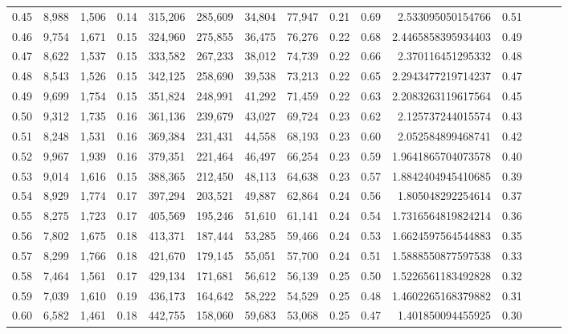 \begin{tabular}{rrrrrrrrrrrrrrr}
0.45 &   8,988 &  1,506 &  0.14 &  315,206 &  285,609 &   34,804 &   77,947 &  0.21 &  0.69 &     2.533095050154766 &      0.51 \\
0.46 &   9,754 &  1,671 &  0.15 &  324,960 &  275,855 &   36,475 &   76,276 &  0.22 &  0.68 &    2.4465858395934403 &      0.49 \\
0.47 &   8,622 &  1,537 &  0.15 &  333,582 &  267,233 &   38,012 &   74,739 &  0.22 &  0.66 &     2.370116451295332 &      0.48 \\
0.48 &   8,543 &  1,526 &  0.15 &  342,125 &  258,690 &   39,538 &   73,213 &  0.22 &  0.65 &    2.2943477219714237 &      0.47 \\
0.49 &   9,699 &  1,754 &  0.15 &  351,824 &  248,991 &   41,292 &   71,459 &  0.22 &  0.63 &    2.2083263119617564 &      0.45 \\
0.50 &   9,312 &  1,735 &  0.16 &  361,136 &  239,679 &   43,027 &   69,724 &  0.23 &  0.62 &     2.125737244015574 &      0.43 \\
0.51 &   8,248 &  1,531 &  0.16 &  369,384 &  231,431 &   44,558 &   68,193 &  0.23 &  0.60 &     2.052584899468741 &      0.42 \\
0.52 &   9,967 &  1,939 &  0.16 &  379,351 &  221,464 &   46,497 &   66,254 &  0.23 &  0.59 &    1.9641865704073578 &      0.40 \\
0.53 &   9,014 &  1,616 &  0.15 &  388,365 &  212,450 &   48,113 &   64,638 &  0.23 &  0.57 &    1.8842404945410685 &      0.39 \\
0.54 &   8,929 &  1,774 &  0.17 &  397,294 &  203,521 &   49,887 &   62,864 &  0.24 &  0.56 &     1.805048292254614 &      0.37 \\
0.55 &   8,275 &  1,723 &  0.17 &  405,569 &  195,246 &   51,610 &   61,141 &  0.24 &  0.54 &    1.7316564819824214 &      0.36 \\
0.56 &   7,802 &  1,675 &  0.18 &  413,371 &  187,444 &   53,285 &   59,466 &  0.24 &  0.53 &    1.6624597564544883 &      0.35 \\
0.57 &   8,299 &  1,766 &  0.18 &  421,670 &  179,145 &   55,051 &   57,700 &  0.24 &  0.51 &    1.5888550877597538 &      0.33 \\
0.58 &   7,464 &  1,561 &  0.17 &  429,134 &  171,681 &   56,612 &   56,139 &  0.25 &  0.50 &    1.5226561183492828 &      0.32 \\
0.59 &   7,039 &  1,610 &  0.19 &  436,173 &  164,642 &   58,222 &   54,529 &  0.25 &  0.48 &    1.4602265168379882 &      0.31 \\
0.60 &   6,582 &  1,461 &  0.18 &  442,755 &  158,060 &   59,683 &   53,068 &  0.25 &  0.47 &     1.401850094455925 &      0.30 \\

\end{tabular}

